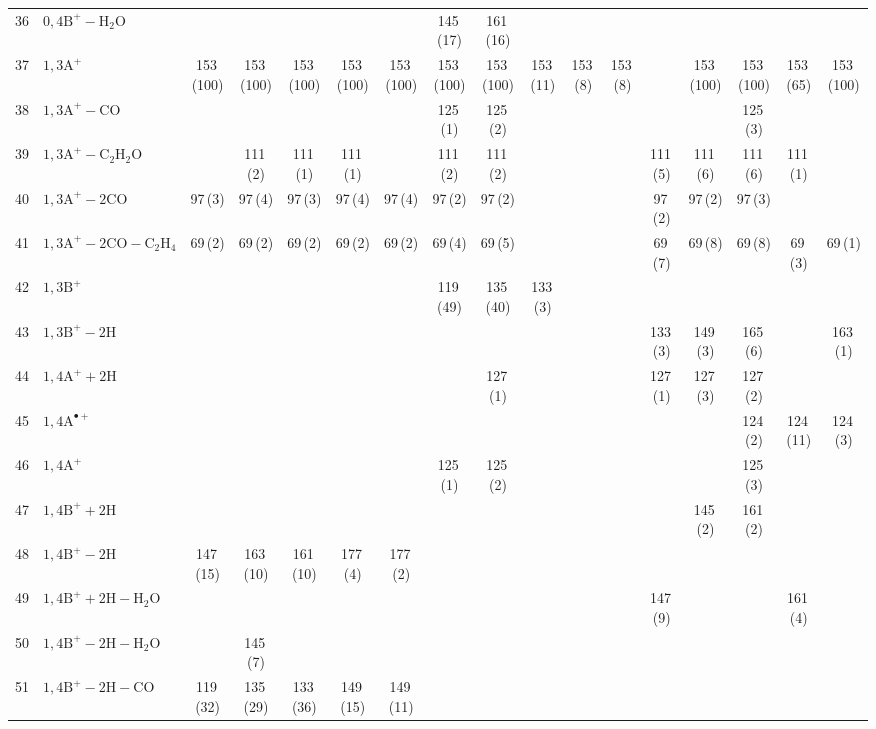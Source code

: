 \documentclass[]{article}
\begin{document}
\begin{table}
{\begin{tabular}{ll|ccccc|ccccc|ccccc}
  36 & $\mathrm{0{,}4B^+{-}H_{2}O}$ &  &  &  &  &  & 145\,(17) & 161\,(16) &  &  &  &  &  &  &  &  \\ 
  37 & $\mathrm{1{,}3A^+}$ & 153\,(100) & 153\,(100) & 153\,(100) & 153\,(100) & 153\,(100) & 153\,(100) & 153\,(100) & 153\,(11) & 153\,(8) & 153\,(8) &  & 153\,(100) & 153\,(100) & 153\,(65) & 153\,(100) \\ 
  38 & $\mathrm{1{,}3A^+{-}CO}$ &  &  &  &  &  & 125\,(1) & 125\,(2) &  &  &  &  &  & 125\,(3) &  &  \\ 
  39 & $\mathrm{1{,}3A^+{-}C_{2}H_{2}O}$ &  & 111\,(2) & 111\,(1) & 111\,(1) &  & 111\,(2) & 111\,(2) &  &  &  & 111\,(5) & 111\,(6) & 111\,(6) & 111\,(1) &  \\ 
  40 & $\mathrm{1{,}3A^+{-}2CO}$ & 97\,(3) & 97\,(4) & 97\,(3) & 97\,(4) & 97\,(4) & 97\,(2) & 97\,(2) &  &  &  & 97\,(2) & 97\,(2) & 97\,(3) &  &  \\ 
  41 & $\mathrm{1{,}3A^+{-}2CO{-}C_{2}H_{4}}$ & 69\,(2) & 69\,(2) & 69\,(2) & 69\,(2) & 69\,(2) & 69\,(4) & 69\,(5) &  &  &  & 69\,(7) & 69\,(8) & 69\,(8) & 69\,(3) & 69\,(1) \\ 
  42 & $\mathrm{1{,}3B^+}$ &  &  &  &  &  & 119\,(49) & 135\,(40) & 133\,(3) &  &  &  &  &  &  &  \\ 
  43 & $\mathrm{1{,}3B^+{-}2H}$ &  &  &  &  &  &  &  &  &  &  & 133\,(3) & 149\,(3) & 165\,(6) &  & 163\,(1) \\ 
  44 & $\mathrm{1{,}4A^+{+}2H}$ &  &  &  &  &  &  & 127\,(1) &  &  &  & 127\,(1) & 127\,(3) & 127\,(2) &  &  \\ 
  45 & $\mathrm{1{,}4A^{\bullet+}}$ &  &  &  &  &  &  &  &  &  &  &  &  & 124\,(2) & 124\,(11) & 124\,(3) \\ 
  46 & $\mathrm{1{,}4A^+}$ &  &  &  &  &  & 125\,(1) & 125\,(2) &  &  &  &  &  & 125\,(3) &  &  \\ 
  47 & $\mathrm{1{,}4B^+{+}2H}$ &  &  &  &  &  &  &  &  &  &  &  & 145\,(2) & 161\,(2) &  &  \\ 
  48 & $\mathrm{1{,}4B^+{-}2H}$ & 147\,(15) & 163\,(10) & 161\,(10) & 177\,(4) & 177\,(2) &  &  &  &  &  &  &  &  &  &  \\ 
  49 & $\mathrm{1{,}4B^+{+}2H{-}H_{2}O}$ &  &  &  &  &  &  &  &  &  &  & 147\,(9) &  &  & 161\,(4) &  \\ 
  50 & $\mathrm{1{,}4B^+{-}2H{-}H_{2}O}$ &  & 145\,(7) &  &  &  &  &  &  &  &  &  &  &  &  &  \\ 
  51 & $\mathrm{1{,}4B^+{-}2H{-}CO}$ & 119\,(32) & 135\,(29) & 133\,(36) & 149\,(15) & 149\,(11) &  &  &  &  &  &  &  &  &  &  \\ 

\end{tabular}}
\end{table}
\end{document}
